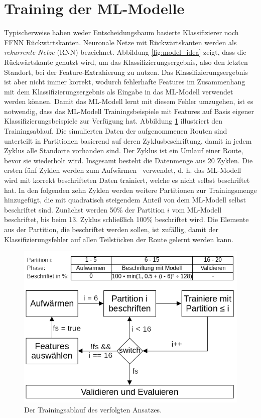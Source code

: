 \section{Training der ML-Modelle}
\label{sec:model_training}
Typischerweise haben weder Entscheidungsbaum basierte Klassifizierer noch FFNN Rückwärtskanten.
Neuronale Netze mit Rückwärtskanten werden als \textit{rekurrente Netze} (RNN) bezeichnet.
Abbildung \ref{fig:model_idea} zeigt, dass die Rückwärtskante genutzt wird, um das Klassifizierungsergebnis,
also den letzten Standort, bei der Feature-Extrahierung zu nutzen.
Das Klassifizierungsergebnis ist aber nicht immer korrekt, wodurch fehlerhafte Features im Zusammenhang
mit dem Klassifizierungsergebnis als Eingabe in das ML-Modell verwendet werden können.
Damit das ML-Modell lernt mit diesem Fehler umzugehen, ist es notwendig, dass das ML-Modell Trainingsbeispiele mit
Features auf Basis eigener Klassifizierungsbeispiele zur Verfügung hat.
\newline
\newline
Abbildung \ref{fig:training_explained} illustriert den Trainingsablauf.
Die simulierten Daten der aufgenommenen Routen sind unterteilt in Partitionen basierend auf deren Zyklusbeschriftung,
damit in jedem Zyklus alle Standorte vorhanden sind.
Der Zyklus ist ein Umlauf einer Route, bevor sie wiederholt wird.
Insgesamt besteht die Datenmenge aus 20 Zyklen.
Die ersten fünf Zyklen werden zum \glqq Aufwärmen \grqq\ verwendet,
d. h. das ML-Modell wird mit korrekt beschrifteten Daten trainiert, welche es nicht selbst beschriftet hat.
In den folgenden zehn Zyklen werden weitere Partitionen zur Trainingsmenge hinzugefügt, die mit quadratisch steigendem Anteil von dem ML-Modell selbst beschriftet sind.
Zunächst werden 50\% der Partition $i$ vom ML-Modell beschriftet, bis beim 13. Zyklus schließlich 100\% beschriftet wird.
Die Elemente aus der Partition, die beschriftet werden sollen, ist zufällig, damit der Klassifizierungsfehler auf allen Teilstücken der Route gelernt werden kann.
\begin{figure}[h!]
    \centering
    \includegraphics[width=\linewidth]{images/training_explained.png}
    \caption{Der Trainingsablauf des verfolgten Ansatzes.}
    \label{fig:training_explained}
\end{figure}
